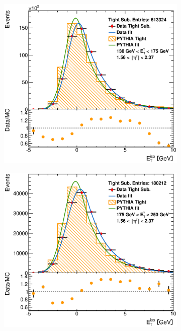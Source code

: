 \documentclass[12pt, twoside]{article}
\numberwithin{equation}{section}
\numberwithin{figure}{section}
\newenvironment{changemargin}[2]{%
\begin{list}{}{%
\setlength{\topsep}{0pt}%
\setlength{\leftmargin}{#1}%
\setlength{\rightmargin}{#2}%
\setlength{\listparindent}{\parindent}%
\setlength{\itemindent}{\parindent}%
\setlength{\parsep}{\parskip}%
}%
\item[]}{\end{list}}
\begin{document}
\begin{figure}[H]
\begin{changemargin}{-1.0cm}{-0.75cm}
\begin{changemargin}{-0.75cm}{-1.0cm}
\begin{subfigure}[b]{0.27\textwidth}
        \end{subfigure}
        \begin{subfigure}[b]{0.27\textwidth}
            \includegraphics[width=\textwidth]{./images/EtISOCorrection/T_MC_FITS-31(10GeV)(Before).eps}
        \end{subfigure}
        \begin{subfigure}[b]{0.27\textwidth}
            \includegraphics[width=\textwidth]{./images/EtISOCorrection/T_MC_FITS-32(10GeV)(Before).eps}
        \end{subfigure}


\end{changemargin}
\end{changemargin}
\end{figure}
\end{document}
